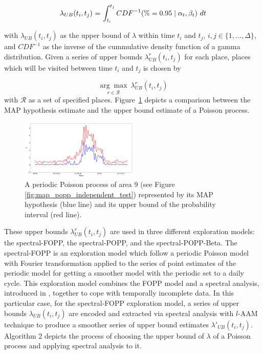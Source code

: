 \begin{equation}
	\label{eq:upper_bound_exploration}
	\begin{tabular}{r@{ = }l}
	$\lambda_{UB}(t_i, t_j)$ & $\displaystyle \int_{t_i}^{t_j} CDF^{-1}(\% = 0.95 \mid \alpha_t, \beta_t)~dt$\\ [1ex]
	\end{tabular}
\end{equation}

\noindent with $\lambda_{UB}(t_i, t_j)$ as the upper bound of $\lambda$ within time $t_i$ and $t_j$, $i, j \in \{1, \ldots, \Delta\}$, and $CDF^{-1}$ as the inverse of the cummulative density function of a gamma distribution. Given a series of upper bounds $\lambda^{r}_{UB}(t_i, t_j)$ for each place, places which will be visited between time $t_i$ and $t_j$ is chosen by

\begin{equation}
\label{eq:choosing_place}
\underset{r \in \mathcal R}{\arg\max}~\lambda^{r}_{UB}(t_i, t_j)
\end{equation}
\noindent with $\mathcal R$ as a set of specified places. Figure~\ref{fig:map_vs_ub} depicts a comparison between the MAP hypothesis estimate and the upper bound estimate of a Poisson process.

\begin{figure}[t!]
	\centering
	\includegraphics[width=0.5\textwidth]{./figures/map_vs_ub.png}
	\caption{A periodic Poisson process of area 9 (see Figure \ref{fig:map_popp_independent_test}) represented by its MAP hypothesis (blue line) and its upper bound of the probability interval (red line).}
	\label{fig:map_vs_ub}
\end{figure}

These upper bounds $\lambda^{r}_{UB}(t_i, t_j)$ are used in three different exploration models: the spectral-FOPP, the spectral-POPP, and the spectral-POPP-Beta. The spectral-FOPP is an exploration model which follow a periodic Poisson model with Fourier transformation applied to the series of point estimates of the periodic model for getting a smoother model with the periodic set to a daily cycle. This exploration model combines the FOPP model and a spectral analysis, introduced in \cite{jovan_iros16}, together to cope with temporally incomplete data. In this particular case, for the spectral-FOPP exploration model, a series of upper bounds $\lambda_{UB}(t_i, t_j)$ are encoded and extracted via spectral analysis with $l$-AAM technique \cite{jovan_iros16} to produce a smoother series of upper bound estimates $\lambda'_{UB}(t_i, t_j)$. Algorithm 2 depicts the process of choosing the upper bound of $\lambda$ of a Poisson process and applying spectral analysis to it.

